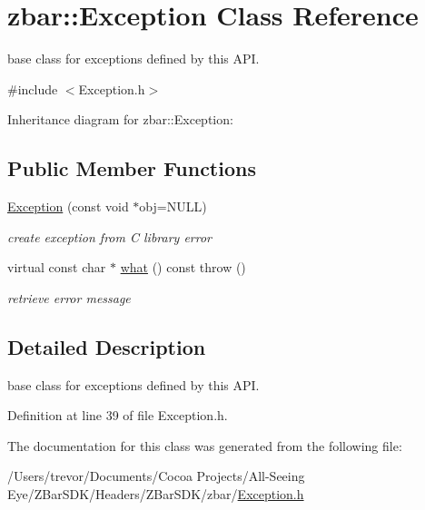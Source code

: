 \hypertarget{classzbar_1_1_exception}{
\section{zbar::Exception Class Reference}
\label{classzbar_1_1_exception}
}


base class for exceptions defined by this API.  




{\ttfamily \#include $<$Exception.h$>$}



Inheritance diagram for zbar::Exception:
\subsection*{Public Member Functions}
\begin{DoxyCompactItemize}
\item 
\hypertarget{classzbar_1_1_exception_afafdeaf85b61f6adcd6338fe685b024d}{
\hyperlink{classzbar_1_1_exception_afafdeaf85b61f6adcd6338fe685b024d}{Exception} (const void $\ast$obj=NULL)}
\label{classzbar_1_1_exception_afafdeaf85b61f6adcd6338fe685b024d}

\begin{DoxyCompactList}\small\item\em create exception from C library error \end{DoxyCompactList}\item 
\hypertarget{classzbar_1_1_exception_a145fd414fa5b4018389df7cc86fac054}{
virtual const char $\ast$ \hyperlink{classzbar_1_1_exception_a145fd414fa5b4018389df7cc86fac054}{what} () const   throw ()}
\label{classzbar_1_1_exception_a145fd414fa5b4018389df7cc86fac054}

\begin{DoxyCompactList}\small\item\em retrieve error message \end{DoxyCompactList}\end{DoxyCompactItemize}


\subsection{Detailed Description}
base class for exceptions defined by this API. 

Definition at line 39 of file Exception.h.



The documentation for this class was generated from the following file:\begin{DoxyCompactItemize}
\item 
/Users/trevor/Documents/Cocoa Projects/All-\/Seeing Eye/ZBarSDK/Headers/ZBarSDK/zbar/\hyperlink{_exception_8h}{Exception.h}\end{DoxyCompactItemize}
